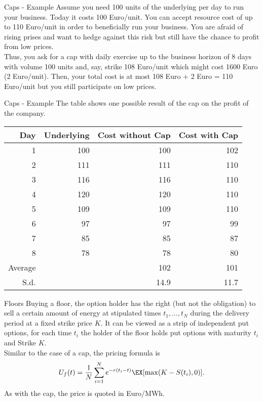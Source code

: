 {Caps - Example}
Assume you need 100 units of the underlying per day to run your business. Today it costs 100 Euro/unit. You can accept resource cost of up to 110 Euro/unit in order to beneficially run your business. You are afraid of rising prises and want to hedge against this risk but still have the chance to profit from low prices.\\
Thus, you ask for a cap with daily exercise up to the business horizon of 8 days with volume 100 units and, say, strike 108 Euro/unit which might cost 1600 Euro (2 Euro/unit). Then, your total cost is at most 108 Euro + 2 Euro = 110 Euro/unit but you still participate on low prices.



{Caps - Example}
The table shows one possible result of the cap on the profit of the company.
\begin{tabular}{rrrr}
       Day & Underlying & Cost without Cap & Cost with Cap \\
\hline
         1 &        100 &        100 &        102 \\
         2 &        111 &        111 &        110 \\
         3 &        116 &        116 &        110 \\
         4 &        120 &        120 &        110 \\
         5 &        109 &        109 &        110 \\
         6 &         97 &         97 &         99 \\
         7 &         85 &         85 &         87 \\
         8 &         78 &         78 &         80 \\
\hline
   Average &            &        102 &        101 \\
   S.d.&&14.9&11.7
\end{tabular}



{Floors}
Buying a floor, the option holder has the right (but not the
obligation) to sell a certain amount of energy at stipulated times
$t_1,\ldots,t_N$ during the delivery period at a fixed strike
price $K$. It can be viewed as a strip of
independent put options, for each time $t_i$ the holder of the floor holds put options with maturity $t_i$ and Strike $K$. \\
Similar to the case of a cap, the pricing formula is
$$U_f(t)=\frac{1}{N}\sum_{i=1}^Ne^{-r(t_i-t)}\EX[\max(K-S(t_i),0)].$$
As with the cap, the price is quoted in Euro/MWh.



